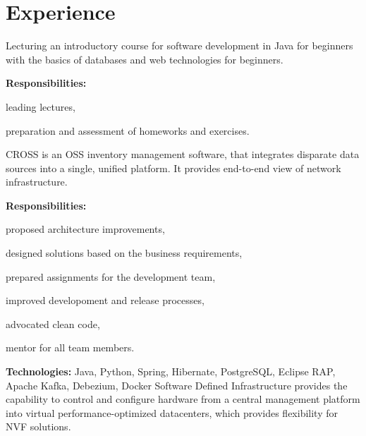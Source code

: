\documentclass[a4paper]{deedy-resume}
\begin{document}
\section{Experience}
\vspace{\topsep}
\vspace{\topsep}
\vspace{\topsep}
Lecturing an introductory course for software development in Java for beginners with the basics of databases and web technologies for beginners.
\vspace{\topsep}

\textbf{Responsibilities:}
\begin{tightitemize}
    \item leading lectures,
    \item preparation and assessment of homeworks and exercises.
\end{tightitemize}
\sectionspace
\vspace{\topsep}
CROSS is an OSS inventory management software, that integrates disparate data sources into a single, unified platform. It provides end-to-end view of network infrastructure.
\vspace{\topsep}

\textbf{Responsibilities:}
\begin{tightitemize}
    \item proposed architecture improvements,
    \item designed solutions based on the business requirements,
    \item prepared assignments for the development team,
    \item improved developoment and release processes,
    \item advocated clean code,
    \item mentor for all team members.
\end{tightitemize}
\vspace{\topsep}
\footnotesize\textbf{Technologies:} Java, Python, Spring, Hibernate, PostgreSQL, Eclipse RAP, Apache Kafka, Debezium, Docker
\normalsize
\sectionspace
\newline
\vspace{\topsep}
Software Defined Infrastructure provides the capability to control and configure hardware from a central management platform into virtual performance-optimized datacenters, which provides flexibility for NVF solutions.
\end{document}
